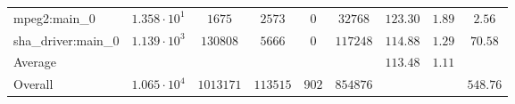 \begin{tabular}{|l|c|c|c|c|c|c|c|c|}
mpeg2:main\_0           & $ 1.358 \cdot 10^{1} $ & $ 1675    $ & $ 2573   $ & $ 0   $ & $ 32768  $ & $ 123.30      $ & $ 1.89    $ & $ 2.56    $ \\
sha\_driver:main\_0     & $ 1.139 \cdot 10^{3} $ & $ 130808  $ & $ 5666   $ & $ 0   $ & $ 117248 $ & $ 114.88      $ & $ 1.29    $ & $ 70.58   $ \\
\hline
Average                 & $                    $ & $         $ & $        $ & $     $ & $        $ & $ 113.48      $ & $ 1.11    $ & $         $ \\
\hline
Overall                 & $ 1.065 \cdot 10^{4} $ & $ 1013171 $ & $ 113515 $ & $ 902 $ & $ 854876 $ & $             $ & $         $ & $ 548.76  $ \\
\hline
\end{tabular}
